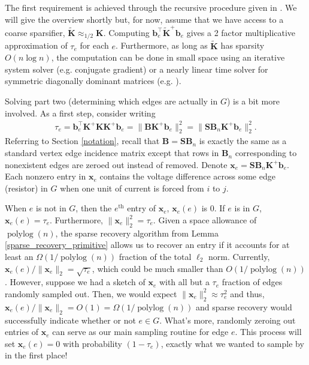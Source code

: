 \documentclass[11pt]{article}
\newcommand{\norm}[1]{\|#1\|}
\newcommand{\bv}[1]{\mathbf{#1}}
\newcommand{\plog}{\mathop\mathrm{polylog}}
\begin{document}
The first requirement is achieved through the recursive procedure given in \cite{pengV1}. We will give the overview shortly but, for now, assume that we have access to a coarse sparsifier, $\bv{\tilde K} \approx_{1/2} \bv{K}$. Computing $\bv{b}_e^\top \bv{\tilde K}^+\bv{b}_e$ gives a 2 factor multiplicative  approximation of $\tau_e$ for each $e$. Furthermore, as long as $\bv{\tilde K}$ has sparsity $O(n\log n)$, the computation can be done in small space using an iterative system solver (e.g. conjugate gradient) or a nearly linear time solver for symmetric diagonally dominant matrices (e.g. \cite{koutis2011nearly}).

Solving part two (determining which edges are actually in $G$) is a bit more involved.
As a first step, consider writing
\begin{align*}
\tau_e = \bv{b}_e^\top \bv{K}^+\bv{K}\bv{K}^+\bv{b}_e = \norm{\bv{B}\bv{K}^+\bv{b}_e}_2^2 = \norm{\bv{S}\bv{B}_n\bv{K}^+\bv{b}_e}_2^2.
\end{align*}
Referring to Section \ref{notation}, recall that $\bv{B} = \bv{S}\bv{B}_n$ is exactly the same as a standard vertex edge incidence matrix except that rows in $\bv{B}_n$ corresponding to nonexistent edges are zeroed out instead of removed. Denote $\bv{x}_e = \bv{S}\bv{B}_n\bv{K}^+\bv{b}_e$. Each nonzero entry in $\bv{x}_e$ contains the voltage difference across some edge (resistor) in $G$ when one unit of current is forced from $i$ to $j$. 

When $e$ is not in $G$, then the $e^\text{th}$ entry of $\bv{x}_e$,  $\bv{x}_e(e)$ is $0$. If $e$ is in $G$, $\bv{x}_e(e) = \tau_e$. Furthermore, $\norm{\bv{x}_e}_2^2 = \tau_e$. 
Given a space allowance of $\plog(n)$, the sparse recovery algorithm from Lemma \ref{sparse_recovery_primitive} allows us to recover an entry if it accounts for at least an $\Omega(1/\plog(n))$ fraction of the total $\ell_2$ norm. Currently, $\bv{x}_e(e)/\norm{\bv{x}_e}_2 = \sqrt{\tau_e}$, which could be much smaller than $O(1/\plog(n))$. However, suppose we had a sketch of $\bv{x}_e$ with all but a $\tau_e$ fraction of edges randomly sampled out. Then, we would expect $\norm{\bv{x}_e}_2^2 \approx \tau_e^2$ and
thus, $\bv{x}_e(e)/\norm{\bv{x}_e}_2 = O(1) = \Omega(1/\plog(n))$ and sparse recovery would successfully indicate whether or not $e\in G$. What's more, randomly zeroing out entries of $\bv{x}_e$ can serve as our main sampling routine for edge $e$. This process will set $\bv{x}_e(e)=0$ with probability $(1-\tau_e)$, exactly what we wanted to sample by in the first place!
\end{document}
